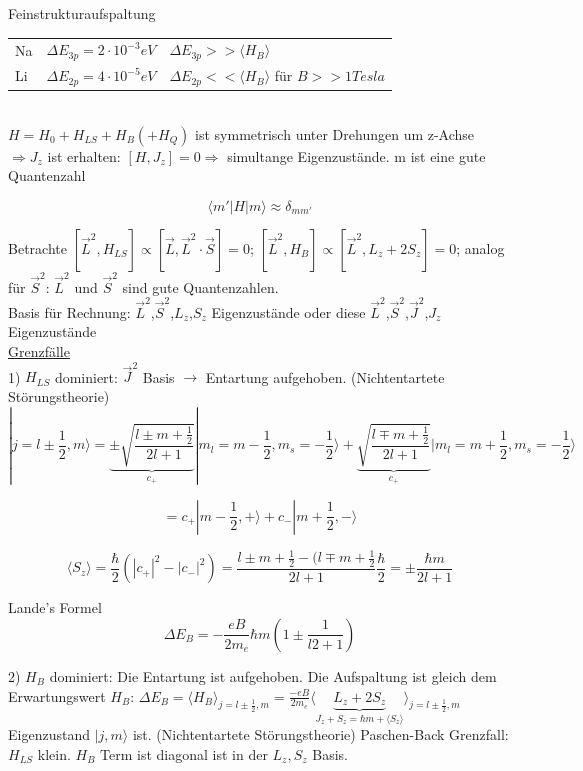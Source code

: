 Feinstrukturaufspaltung
\\

\begin{tabular}{lll}
  Na&\(\Delta E_{3p}=2\cdot 10^{-3}eV\) & \(\Delta E_{3p}>> \langle  H_B\rangle\) \\
  Li&\(\Delta E_{2p}=4\cdot 10^{-5}eV\) & \(\Delta E_{2p}<< \langle  H_B\rangle\) für \(B>>1Tesla\)
\end{tabular}
\\

\(H=H_0+H_{LS}+H_B(+H_Q)\) ist symmetrisch unter Drehungen um z-Achse \(\Rightarrow J_z\) ist erhalten: \([H,J_z]=0 \Rightarrow\) simultange Eigenzustände. m ist eine gute Quantenzahl

\[ \langle m'|H|m\rangle \approx \delta_{mm'} \]

Betrachte \([\vec L^2,H_{LS}]\propto[\vec L,\vec L^2\cdot \vec S] = 0\); \([\vec L^2,H_{B}]\propto[\vec L^2,L_z+2S_z] = 0\); analog für \(\vec S^2\): \(\vec L^2\) und \(\vec S^2\) sind gute Quantenzahlen.
\\

Basis für Rechnung: \(\vec L^2\),\(\vec S^2\),\(L_z\),\(S_z\) Eigenzustände oder diese \(\vec L^2\),\(\vec S^2\),\(\vec J^2\),\(J_z\) Eigenzustände
\\

\underline{Grenzfälle}
\\
1) \(H_{LS}\) dominiert: \(\vec J^2\) Basis \(\rightarrow\) Entartung aufgehoben. (Nichtentartete Störungstheorie)
\\
\[ |j=l\pm \frac{1}{2},m\rangle = \underbrace{\pm\sqrt{\frac{l\pm m+\frac{1}{2}}{2l+1}}}_{c_+}|m_l=m-\frac{1}{2},m_s=-\frac{1}{2}\rangle +\underbrace{\sqrt{\frac{l\mp m+\frac{1}{2}}{2l+1}}}_{c_+}|m_l=m+\frac{1}{2},m_s=-\frac{1}{2}\rangle \]

\[ = c_+|m-\frac{1}{2},+\rangle + c_-|m+\frac{1}{2},-\rangle\]

\[ \langle S_z\rangle = \frac{\hbar}{2}(|c_+|^2-|c_-|^2)= \frac{l\pm m+\frac{1}{2}-(l\mp m+\frac{1}{2}}{2l+1}\frac{\hbar}{2}=\pm \frac{\hbar m}{2l+1}\]

Lande's Formel
\\
\[\boxed{\Delta E_B = -\frac{eB}{2m_e}\hbar m(1\pm \frac{1}{l2+1})}\]

2) \(H_B\) dominiert: Die Entartung ist aufgehoben. Die Aufspaltung ist gleich dem Erwartungswert \(H_B\): \(\Delta E_B = \langle H_B\rangle_{j=l\pm\frac{1}{2},m}=\frac{-eB}{2m_e}\langle \underbrace{L_z+2S_z}_{J_z+S_z=\hbar m+\langle S_z\rangle}\rangle_{j=l\pm\frac{1}{2},m}\) Eigenzustand \(|j,m\rangle\) ist. (Nichtentartete Störungstheorie)
Paschen-Back Grenzfall: \(H_{LS}\) klein. \(H_B\) Term ist diagonal ist in der \(L_z,S_z\) Basis.

